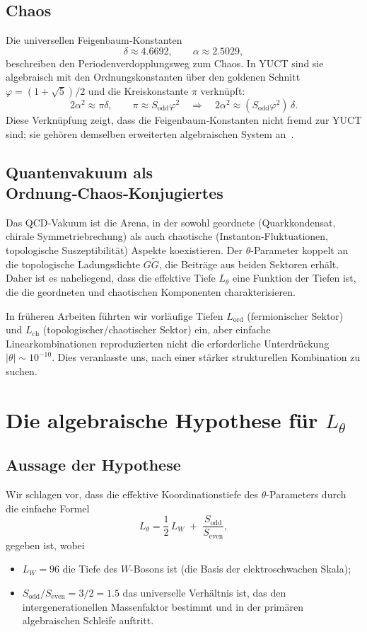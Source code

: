\documentclass[12pt,a4paper]{article}
\begin{document}
	\subsection{Chaos}
	Die universellen Feigenbaum‑Konstanten
	\[
	\delta \approx 4.6692,\qquad \alpha \approx 2.5029,
	\]
	beschreiben den Periodenverdopplungsweg zum Chaos. In YUCT sind sie algebraisch mit den Ordnungskonstanten über den goldenen Schnitt \(\varphi = (1+\sqrt{5})/2\) und die Kreiskonstante \(\pi\) verknüpft:
	\[
	2\alpha^2 \approx \pi\delta,\qquad
	\pi \approx S_{\mathrm{odd}}\varphi^2 \quad \Longrightarrow \quad 
	2\alpha^2 \approx (S_{\mathrm{odd}}\varphi^2)\,\delta .
	\]
	Diese Verknüpfung zeigt, dass die Feigenbaum‑Konstanten nicht fremd zur YUCT sind; sie gehören demselben erweiterten algebraischen System an~\cite{Y2}.
	
	\subsection{Quantenvakuum als Ordnung‑Chaos‑Konjugiertes}
	Das QCD‑Vakuum ist die Arena, in der sowohl geordnete (Quarkkondensat, chirale Symmetriebrechung) als auch chaotische (Instanton‑Fluktuationen, topologische Suszeptibilität) Aspekte koexistieren. Der \(\theta\)-Parameter koppelt an die topologische Ladungsdichte \(G\widetilde{G}\), die Beiträge aus beiden Sektoren erhält. Daher ist es naheliegend, dass die effektive Tiefe \(L_\theta\) eine Funktion der Tiefen ist, die die geordneten und chaotischen Komponenten charakterisieren.
	
	In früheren Arbeiten führten wir vorläufige Tiefen \(L_{\mathrm{ord}}\) (fermionischer Sektor) und \(L_{\mathrm{ch}}\) (topologischer/chaotischer Sektor) ein, aber einfache Linearkombinationen reproduzierten nicht die erforderliche Unterdrückung \(|\theta| \sim 10^{-10}\). Dies veranlasste uns, nach einer stärker strukturellen Kombination zu suchen.
	
	\section{Die algebraische Hypothese für \(L_\theta\)}
	\label{sec:hypothesis}
	
	\subsection{Aussage der Hypothese}
	
	Wir schlagen vor, dass die effektive Koordinationstiefe des \(\theta\)-Parameters durch die einfache Formel
	\begin{equation}
		\boxed{L_\theta = \frac{1}{2}\,L_W \;+\; \frac{S_{\mathrm{odd}}}{S_{\mathrm{even}}}},
		\label{eq:Ltheta}
	\end{equation}
	gegeben ist, wobei
	\begin{itemize}
		\item \(L_W = 96\) die Tiefe des \(W\)-Bosons ist (die Basis der elektroschwachen Skala);
		\item \(S_{\mathrm{odd}}/S_{\mathrm{even}} = 3/2 = 1.5\) das universelle Verhältnis ist, das den intergenerationellen Massenfaktor bestimmt und in der primären algebraischen Schleife auftritt.
	\end{itemize}
	
\end{document}
